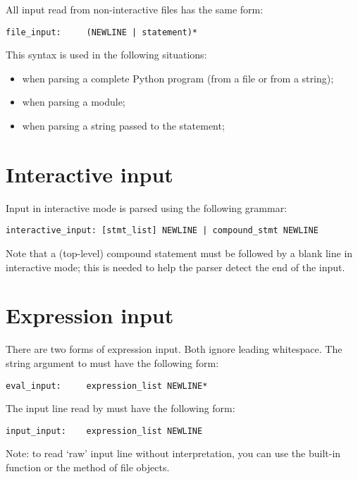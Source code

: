 All input read from non-interactive files has the same form:

\begin{verbatim}
file_input:     (NEWLINE | statement)*
\end{verbatim}

This syntax is used in the following situations:

\begin{itemize}

\item when parsing a complete Python program (from a file or from a string);

\item when parsing a module;

\item when parsing a string passed to the  statement;

\end{itemize}

\section{Interactive input\label{interactive}}

Input in interactive mode is parsed using the following grammar:

\begin{verbatim}
interactive_input: [stmt_list] NEWLINE | compound_stmt NEWLINE
\end{verbatim}

Note that a (top-level) compound statement must be followed by a blank
line in interactive mode; this is needed to help the parser detect the
end of the input.

\section{Expression input\label{expression-input}}

There are two forms of expression input.  Both ignore leading
whitespace.
The string argument to  must have the following form:

\begin{verbatim}
eval_input:     expression_list NEWLINE*
\end{verbatim}

The input line read by  must have the following form:

\begin{verbatim}
input_input:    expression_list NEWLINE
\end{verbatim}

Note: to read `raw' input line without interpretation, you can use the
built-in function  or the  method
of file objects.

